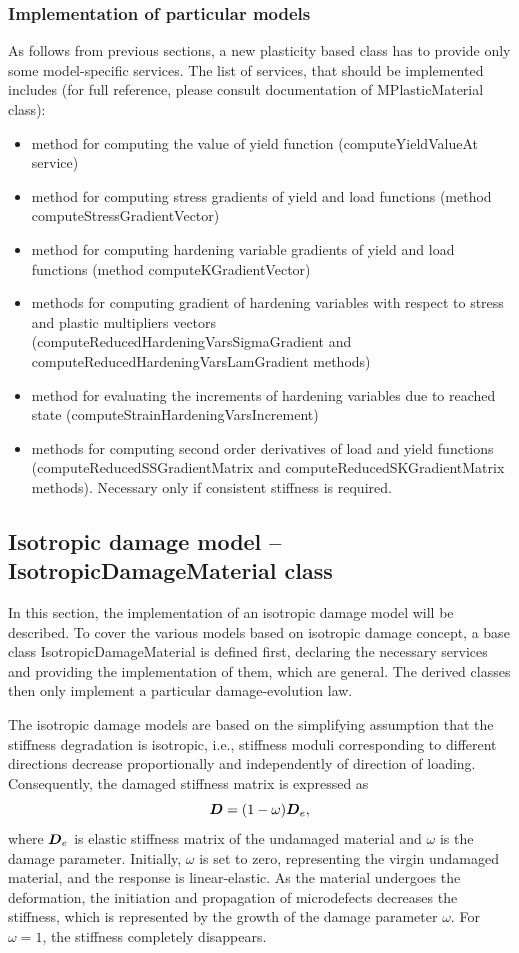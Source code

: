 \documentclass[a4paper]{article}
\newcommand{\mbf}[1]{\mbox{\boldmath$#1$}}
\begin{document}
\subsubsection{Implementation of particular models}

As follows from previous sections, a new plasticity based class has to
provide only some model-specific services. The list of services, that
should be implemented includes (for full reference, please consult
documentation of MPlasticMaterial class):
\begin{itemize}
\item method for computing the value of yield function
  (computeYieldValueAt service)
\item method for computing stress gradients of yield and load
  functions (method computeStressGradientVector)
\item method for computing hardening variable gradients of yield and load
  functions (method computeKGradientVector)
\item methods for computing gradient of hardening variables with
  respect to stress and plastic multipliers vectors
  (computeReducedHardeningVarsSigmaGradient and
  computeReducedHardeningVarsLamGradient methods)
\item method for evaluating the increments of hardening variables due
  to reached state (computeStrainHardeningVarsIncrement)
\item methods for computing second order derivatives of load and yield
  functions (computeReducedSSGradientMatrix and
  computeReducedSKGradientMatrix methods). Necessary only if consistent stiffness is required.
\end{itemize}




\subsection{Isotropic damage model -- IsotropicDamageMaterial class}
\label{IsoDamMod}
 In this section, the implementation of an isotropic damage model will be
 described. To cover the various models based on isotropic damage concept,
 a base class IsotropicDamageMaterial is defined first,
 declaring the necessary services and providing the implementation of
 them, which are general. The derived classes then only  implement a particular
 damage-evolution law.

 The isotropic damage models are based on the simplifying assumption
 that the stiffness degradation is isotropic, i.e., stiffness moduli
 corresponding to different directions decrease proportionally and
 independently of direction of loading. Consequently, the damaged
 stiffness matrix is expressed as
 $$
\mbf{D} = (1-\omega)\mbf{D}_e,
 $$
 where $\mbf{D}_e$ is elastic stiffness matrix of the undamaged
 material and $\omega$ is the damage parameter. Initially, $\omega$ is
 set to zero, representing the virgin undamaged material, and the response is
 linear-elastic. As the material undergoes the deformation, the
 initiation and propagation of microdefects decreases the stiffness,
 which is represented by the growth of the damage parameter $\omega$.
 For $\omega = 1$, the stiffness completely disappears.
\end{document}
